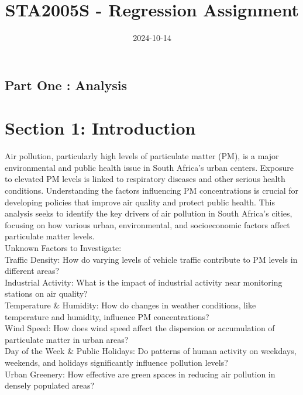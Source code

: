 \documentclass[12pt,halfline,a4paper,]{ouparticle}
\begin{document}
\title{STA2005S - Regression Assignment}

\author{%
%
%
%
%
%
%
%
%
%
\and
{}
%
%
%
%
%
%
}

\abstract{}

\date{2024-10-14}

\keywords{}

\maketitle



\newpage

\hypertarget{part-one-analysis}{%
\subsection{Part One : Analysis}\label{part-one-analysis}}

\hypertarget{section-1-introduction}{%
\section{Section 1: Introduction}\label{section-1-introduction}}

Air pollution, particularly high levels of particulate matter (PM), is a
major environmental and public health issue in South Africa's urban
centers. Exposure to elevated PM levels is linked to respiratory
diseases and other serious health conditions. Understanding the factors
influencing PM concentrations is crucial for developing policies that
improve air quality and protect public health. This analysis seeks to
identify the key drivers of air pollution in South Africa's cities,
focusing on how various urban, environmental, and socioeconomic factors
affect particulate matter levels.\\
Unknown Factors to Investigate:\\
Traffic Density: How do varying levels of vehicle traffic contribute to
PM levels in different areas?\\
Industrial Activity: What is the impact of industrial activity near
monitoring stations on air quality?\\
Temperature \& Humidity: How do changes in weather conditions, like
temperature and humidity, influence PM concentrations?\\
Wind Speed: How does wind speed affect the dispersion or accumulation of
particulate matter in urban areas?\\
Day of the Week \& Public Holidays: Do patterns of human activity on
weekdays, weekends, and holidays significantly influence pollution
levels?\\
Urban Greenery: How effective are green spaces in reducing air pollution
in densely populated areas?
\end{document}
